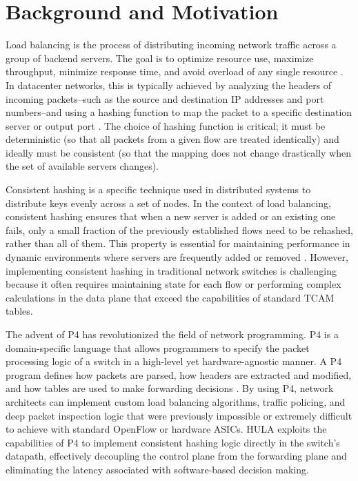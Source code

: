 \documentclass[12pt,a4paper]{article}
\begin{document}
\section{Background and Motivation}

Load balancing is the process of distributing incoming network traffic across a group of backend servers. The goal is to optimize resource use, maximize throughput, minimize response time, and avoid overload of any single resource \cite{ref10}. In datacenter networks, this is typically achieved by analyzing the headers of incoming packets--such as the source and destination IP addresses and port numbers--and using a hashing function to map the packet to a specific destination server or output port \cite{ref11}. The choice of hashing function is critical; it must be deterministic (so that all packets from a given flow are treated identically) and ideally must be consistent (so that the mapping does not change drastically when the set of available servers changes).

Consistent hashing is a specific technique used in distributed systems to distribute keys evenly across a set of nodes. In the context of load balancing, consistent hashing ensures that when a new server is added or an existing one fails, only a small fraction of the previously established flows need to be rehashed, rather than all of them. This property is essential for maintaining performance in dynamic environments where servers are frequently added or removed \cite{ref12}. However, implementing consistent hashing in traditional network switches is challenging because it often requires maintaining state for each flow or performing complex calculations in the data plane that exceed the capabilities of standard TCAM tables.

The advent of P4 has revolutionized the field of network programming. P4 is a domain-specific language that allows programmers to specify the packet processing logic of a switch in a high-level yet hardware-agnostic manner. A P4 program defines how packets are parsed, how headers are extracted and modified, and how tables are used to make forwarding decisions \cite{ref13}. By using P4, network architects can implement custom load balancing algorithms, traffic policing, and deep packet inspection logic that were previously impossible or extremely difficult to achieve with standard OpenFlow or hardware ASICs. HULA exploits the capabilities of P4 to implement consistent hashing logic directly in the switch's datapath, effectively decoupling the control plane from the forwarding plane and eliminating the latency associated with software-based decision making.
\end{document}
